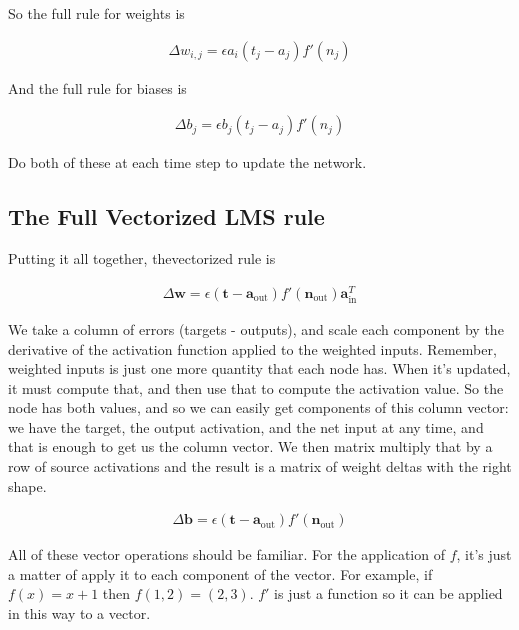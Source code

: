 So  the full rule for weights is

\begin{eqnarray*}
\Delta w_{i,j}  =  \epsilon a_i (t_j - a_j) f' (n_j)
\end{eqnarray*}

And the full rule for biases is 

\begin{eqnarray*}
\Delta b_{j}  =  \epsilon b_j (t_j - a_j) f' (n_j)
\end{eqnarray*}

Do both of these at each time step to update the network.

\subsection{The Full Vectorized LMS rule}

Putting it all together, thevectorized rule is

\begin{eqnarray*}
\Delta \mathbf{w}  =  \epsilon (\mathbf{t} - \mathbf{a}_{\text{out}}) f'( \mathbf{n}_{\text{out}}) \mathbf{a}_{\text{in}}^T
\end{eqnarray*}

We take a column of errors (targets - outputs), and scale each component by the derivative of the activation function applied to the weighted inputs. Remember, weighted inputs is just one more quantity that each node has. When it's updated, it must compute that, and then use that to compute the activation value. So the node has both values, and so we can easily get components of this column vector: we have the target, the output activation, and the net input at any time, and that is enough to get us the column vector. We then matrix multiply that by a row of source activations and the result is a matrix of weight deltas with the right shape.

\begin{eqnarray*}
\Delta \mathbf{b}  =  \epsilon (\mathbf{t} - \mathbf{a}_{\text{out}}) f'( \mathbf{n}_{\text{out}})
\end{eqnarray*}

All of these vector operations should be familiar. For the application of $f$, it's just a matter of apply it to each component of the vector.  For example, if $f(x) = x+1$ then $f(1,2) = (2,3)$. $f'$ is just a function so it can be applied in this way to a vector.

